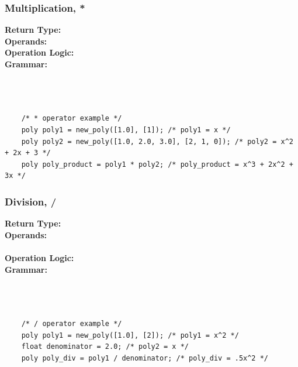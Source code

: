 \documentclass{article}
\begin{document}
    \subsubsection{Multiplication, *}
    \textbf{Return Type:}\\
    \textbf{Operands:}\\
    \textbf{Operation Logic:}\\
    \textbf{Grammar:}\\
    \\
    \\
    \\
    \begin{lstlisting}
    /* * operator example */
    poly poly1 = new_poly([1.0], [1]); /* poly1 = x */
    poly poly2 = new_poly([1.0, 2.0, 3.0], [2, 1, 0]); /* poly2 = x^2 + 2x + 3 */
    poly poly_product = poly1 * poly2; /* poly_product = x^3 + 2x^2 + 3x */
    \end{lstlisting}
    
    \subsubsection{Division, /}
    \textbf{Return Type:}\\
    \textbf{Operands:}\\
    \\
    \textbf{Operation Logic:}\\
    \textbf{Grammar:}\\
    \\
    \\
    \\
    \begin{lstlisting}
    /* / operator example */
    poly poly1 = new_poly([1.0], [2]); /* poly1 = x^2 */
    float denominator = 2.0; /* poly2 = x */
    poly poly_div = poly1 / denominator; /* poly_div = .5x^2 */
    \end{lstlisting}
\end{document}
